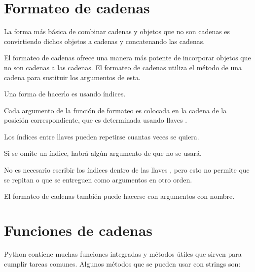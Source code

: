 \section{Formateo de cadenas}

La forma más básica de combinar cadenas y objetos que no son cadenas es convirtiendo dichos objetos a cadenas y concatenando las cadenas.

El formateo de cadenas ofrece una manera más potente de incorporar objetos que no son cadenas a las cadenas.
El formateo de cadenas utiliza el método  de una cadena para sustituir los argumentos de esta.

Una forma de hacerlo es usando índices.


Cada argumento de la función de formateo es colocada en la cadena de la posición correspondiente, que es determinada usando llaves \ttt{\{\}}.

Los índices entre llaves \ttt{\{\}} pueden repetirse cuantas veces se quiera.


Si se omite un índice, habrá algún argumento de  que no se usará.


No es necesario escribir los índices dentro de las llaves \ttt{\{\}}, pero esto no permite que se repitan o que se entreguen como argumentos en otro orden.


El formateo de cadenas también puede hacerse con argumentos con nombre.


\section{Funciones de cadenas}

Python contiene muchas funciones integradas y métodos útiles que sirven para cumplir tareas comunes.
Algunos métodos que se pueden usar con strings son:

